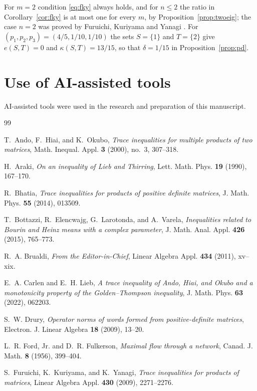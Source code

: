 \documentclass{amsart}
\theoremstyle{definition}
\theoremstyle{remark}
\numberwithin{equation}{section}
\newcommand{\cut}{\kappa}
\begin{document}
For $m=2$ condition \eqref{eq:fky} always holds, and for $n\le 2$ the ratio in Corollary~\ref{cor:fky} is at most one for every $m$, by Proposition~\ref{prop:twoeig}; the case $n=2$ was proved by Furuichi, Kuriyama and Yanagi \cite{FKY}. For $(p_1,p_2,p_3)=(4/5,1/10,1/10)$ the sets $S=\{1\}$ and $T=\{2\}$ give $e(S,T)=0$ and $\cut(S,T)=13/15$, so that $\delta=1/15$ in Proposition~\ref{prop:pd}.

\section*{Use of AI-assisted tools}

AI-assisted tools were used in the research and preparation of this manuscript.

\begin{thebibliography}{99}

T.~Ando, F.~Hiai, and K.~Okubo, \emph{Trace inequalities for multiple products of two matrices}, Math. Inequal. Appl. \textbf{3} (2000), no.~3, 307--318.

H.~Araki, \emph{On an inequality of Lieb and Thirring}, Lett. Math. Phys. \textbf{19} (1990), 167--170.

R.~Bhatia, \emph{Trace inequalities for products of positive definite matrices}, J. Math. Phys. \textbf{55} (2014), 013509.

T.~Bottazzi, R.~Elencwajg, G.~Larotonda, and A.~Varela, \emph{Inequalities related to Bourin and Heinz means with a complex parameter}, J. Math. Anal. Appl. \textbf{426} (2015), 765--773.

R.~A. Brualdi, \emph{From the Editor-in-Chief}, Linear Algebra Appl. \textbf{434} (2011), xv--xix.

E.~A. Carlen and E.~H. Lieb, \emph{A trace inequality of Ando, Hiai, and Okubo and a monotonicity property of the Golden--Thompson inequality}, J. Math. Phys. \textbf{63} (2022), 062203.

S.~W. Drury, \emph{Operator norms of words formed from positive-definite matrices}, Electron. J. Linear Algebra \textbf{18} (2009), 13--20.

L.~R. Ford, Jr. and D.~R. Fulkerson, \emph{Maximal flow through a network}, Canad. J. Math. \textbf{8} (1956), 399--404.

S.~Furuichi, K.~Kuriyama, and K.~Yanagi, \emph{Trace inequalities for products of matrices}, Linear Algebra Appl. \textbf{430} (2009), 2271--2276.


\end{thebibliography}
\end{document}
